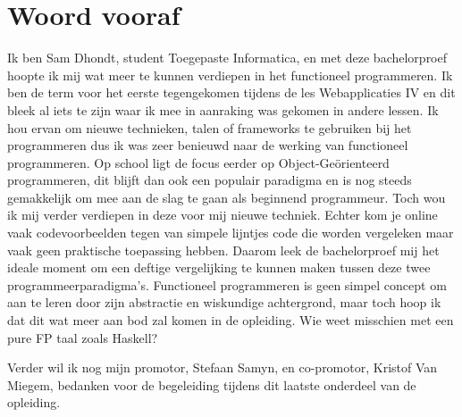 
\chapter*{Woord vooraf}
\label{ch:voorwoord}


Ik ben Sam Dhondt, student Toegepaste Informatica, en met deze bachelorproef hoopte ik mij wat meer te kunnen verdiepen in het functioneel programmeren. Ik ben de term voor het eerste tegengekomen tijdens de les Webapplicaties IV en dit bleek al iets te zijn waar ik mee in aanraking was gekomen in andere lessen. Ik hou ervan om nieuwe technieken, talen of frameworks te gebruiken bij het programmeren dus ik was zeer benieuwd naar de werking van functioneel programmeren. Op school ligt de focus eerder op Object-Geörienteerd programmeren, dit blijft dan ook een populair paradigma en is nog steeds gemakkelijk om mee aan de slag te gaan als beginnend programmeur. Toch wou ik mij verder verdiepen in deze voor mij nieuwe techniek. Echter kom je online vaak codevoorbeelden tegen van simpele lijntjes code die worden vergeleken maar vaak geen praktische toepassing hebben. Daarom leek de bachelorproef mij het ideale moment om een deftige vergelijking te kunnen maken tussen deze twee programmeerparadigma's. Functioneel programmeren is geen simpel concept om aan te leren door zijn abstractie en wiskundige achtergrond, maar toch hoop ik dat dit wat meer aan bod zal komen in de opleiding. Wie weet misschien met een pure FP taal zoals Haskell?

Verder wil ik nog mijn promotor, Stefaan Samyn, en co-promotor, Kristof Van Miegem, bedanken voor de begeleiding tijdens dit laatste onderdeel van de opleiding.